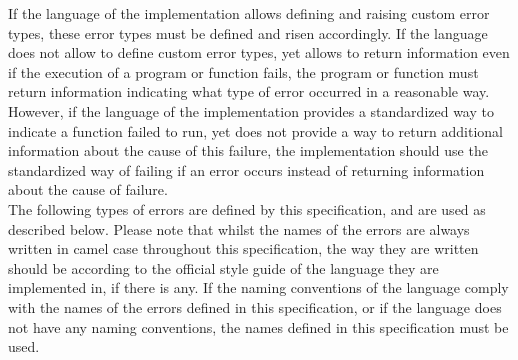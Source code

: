 \documentclass{article}
\begin{document}
    If the language of the implementation allows defining and raising custom error types, these error types must be defined and risen accordingly.
    If the language does not allow to define custom error types, yet allows to return information even if the execution of a program or function fails, the program or function must return information indicating what type of error occurred in a reasonable way.
    However, if the language of the implementation provides a standardized way to indicate a function failed to run, yet does not provide a way to return additional information about the cause of this failure, the implementation should use the standardized way of failing if an error occurs instead of returning information about the cause of failure.\\

    The following types of errors are defined by this specification, and are used as described below.
    Please note that whilst the names of the errors are always written in camel case throughout this specification, the way they are written should be according to the official style guide of the language they are implemented in, if there is any.
    If the naming conventions of the language comply with the names of the errors defined in this specification, or if the language does not have any naming conventions, the names defined in this specification must be used.
\end{document}
